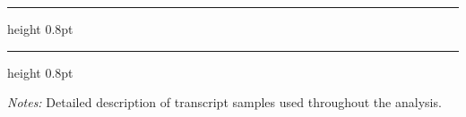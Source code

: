 \begin{table}[htbp]
\begin{minipage}{\textwidth}
\vspace{0.5em}
\hrule height 0.8pt
\vspace{0.2em}
\hrule height 0.8pt
\end{minipage}
\begin{minipage}{\textwidth}
    \vspace{1em}
    \footnotesize
    \textit{Notes:} Detailed description of transcript samples used throughout the analysis.
\end{minipage}
\end{table}

